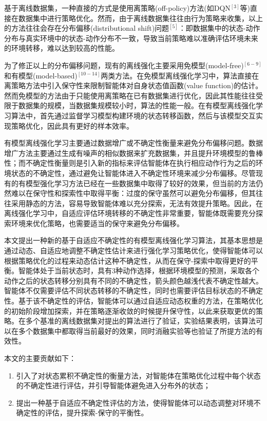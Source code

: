 \documentclass{article}
\begin{document}
基于离线数据集，一种直接的方式是使用离策略(off-policy)方法(如DQN$^{[3]}$等)直接在数据集中进行策略优化。然而，由于离线数据集往往由行为策略来收集，以上的方法往往会存在分布偏移(distributional shift)问题$^{[5]}$：即数据集中的状态-动作分布与真实环境中的状态-动作分布不一致，导致当前策略难以准确评估环境未来的环境转移，难以达到较高的性能。

为了修正以上的分布偏移问题，现有的离线强化主要采用免模型(model-free)$^{[6-9]}$和有模型(model-based)$^{[10-14]}$两类方法。在免模型离线强化学习中，算法直接在离策略方法中引入保守性来限制智能体对自身状态值函数(value function)的估计。然而免模型的方法由于只能使用离策略在已有数据集进行优化，因此其性能往往受限于数据集的规模，当数据集规模较小时，算法的性能一般。在有模型离线强化学习算法中，首先通过监督学习模型构建环境的状态转移函数，然后与该模型交互实现策略优化，因此具有更好的样本效率。

有模型离线强化学习主要通过数据增广或不确定性衡量来避免分布偏移问题。数据增广方法主要通过生成有噪声的相似数据来扩充数据集，并且提升环境模型的鲁棒性；而不确定性衡量则是引入新的指标来评估智能体在执行相应动作行为之后的环境状态的不确定性，通过避免让智能体进入不确定性环境来减少分布偏移。尽管现有的有模型强化学习方法已经在一些数据集中取得了较好的效果，但当前的方法仍然难以在保守性和探索性中取得平衡：过度的保守虽然可以避免分布偏移，但其往往采用静态的方法，容易导致智能体难以充分探索，无法有效提升策略。因此，在离线强化学习中，自适应评估环境转移的不确定性非常重要，智能体既需要充分探索环境来优化策略，也需要适当的保守来避免分布偏移。

本文提出一种新的基于自适应不确定性的有模型离线强化学习算法，其基本思想是通过动态、自适应地调整不确定性估计来进行强化学习策略优化，使得智能体可以根据策略优化的过程来动态估计这种不确定性，从而在保守-探索中取得更好的平衡。智能体处于当前状态时，具有3种动作选择，根据环境模型的预测，采取各个动作之后的状态转移分别具有不同的不确定性，箭头颜色越浅代表不确定性越大。智能体不仅需要评估不同状态转移的不确定性，同时也需要评估目标状态的不确定性。基于该不确定性的评估，智能体可以通过自适应动态权重的方法，在策略优化的初始阶段增加探索，并在策略逐渐收敛的时候提升保守性，以此来获取更优的策略。在多个基准的离线数据集对提出的算法进行了验证，实验结果表明，该算法可以在多个数据集中都取得当前最好的效果，同时消融实验等也验证了所提方法的有效性。

本文的主要贡献如下：
\begin{enumerate}
  \item 引入了对状态累积不确定性的衡量方法，对智能体在策略优化过程中每个状态的不确定性进行评估，并引导智能体避免进入分布外的状态；
  \item 提出一种基于自适应不确定性评估的方法，使得智能体可以动态调整对环境不确定性的评估，提升探索-保守的平衡性。
\end{enumerate}
\end{document}

